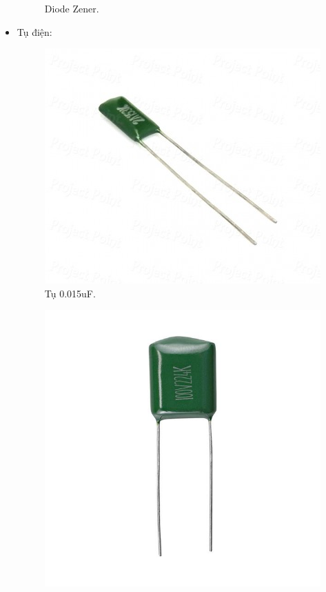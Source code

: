 \documentclass[a4paper,12pt,oneside]{article}
\begin{document}
\begin{itemize}
\begin{figure}[H]
\caption{Diode Zener.}
\end{figure}
\item	Tụ điện:
\begin{figure}[H]
\centering
\begin{center}
\includegraphics[scale=.5]{hinh/PPM/ppm_c015.jpg}
\end{center}
\caption{Tụ 0.015uF.}
\end{figure}
\begin{figure}[H]
\centering
\begin{center}
\includegraphics[scale=.3]{hinh/PPM/ppm_c22.jpg}

\end{center}
\end{figure}
\end{itemize}
\end{document}
